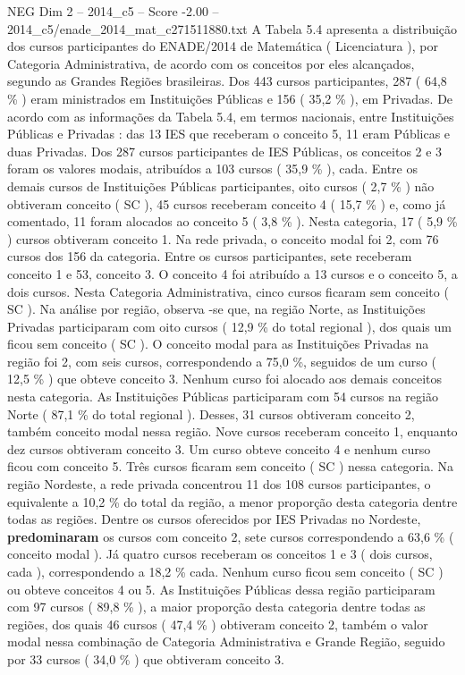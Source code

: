 \begin{textsample}{NEG Dim 2 – 2014\_c5 – Score -2.00 – 2014\_c5/enade\_2014\_mat\_c271511880.txt}
A Tabela 5.4 apresenta a distribuição dos cursos participantes do ENADE/2014 de Matemática ( Licenciatura ), por Categoria Administrativa, de acordo com os conceitos por eles alcançados, segundo as Grandes Regiões brasileiras.
Dos 443 cursos participantes, 287 ( 64,8 \% ) eram ministrados em Instituições Públicas e 156 ( 35,2 \% ), em Privadas.
De acordo com as informações da Tabela 5.4, em termos nacionais, entre Instituições Públicas e Privadas : das 13 IES que receberam o conceito 5, 11 eram Públicas e duas Privadas.
Dos 287 cursos participantes de IES Públicas, os conceitos 2 e 3 foram os valores modais, atribuídos a 103 cursos ( 35,9 \% ), cada.
Entre os demais cursos de Instituições Públicas participantes, oito cursos ( 2,7 \% ) não obtiveram conceito ( SC ), 45 cursos receberam conceito 4 ( 15,7 \% ) e, como já comentado, 11 foram alocados ao conceito 5 ( 3,8 \% ).
Nesta categoria, 17 ( 5,9 \% ) cursos obtiveram conceito 1.
Na rede privada, o conceito modal foi 2, com 76 cursos dos 156 da categoria.
Entre os cursos participantes, sete receberam conceito 1 e 53, conceito 3.
O conceito 4 foi atribuído a 13 cursos e o conceito 5, a dois cursos.
Nesta Categoria Administrativa, cinco cursos ficaram sem conceito ( SC ).
Na análise por região, observa -se que, na região Norte, as Instituições Privadas participaram com oito cursos ( 12,9 \% do total regional ), dos quais um ficou sem conceito ( SC ).
O conceito modal para as Instituições Privadas na região foi 2, com seis cursos, correspondendo a 75,0 \%, seguidos de um curso ( 12,5 \% ) que obteve conceito 3.
Nenhum curso foi alocado aos demais conceitos nesta categoria.
As Instituições Públicas participaram com 54 cursos na região Norte ( 87,1 \% do total regional ).
Desses, 31 cursos obtiveram conceito 2, também conceito modal nessa região.
Nove cursos receberam conceito 1, enquanto dez cursos obtiveram conceito 3.
Um curso obteve conceito 4 e nenhum curso ficou com conceito 5.
Três cursos ficaram sem conceito ( SC ) nessa categoria.
Na região Nordeste, a rede privada concentrou 11 dos 108 cursos participantes, o equivalente a 10,2 \% do total da região, a menor proporção desta categoria dentre todas as regiões.
Dentre os cursos oferecidos por IES Privadas no Nordeste, \textbf{predominaram} os cursos com conceito 2, sete cursos correspondendo a 63,6 \% ( conceito modal ).
Já quatro cursos receberam os conceitos 1 e 3 ( dois cursos, cada ), correspondendo a 18,2 \% cada.
Nenhum curso ficou sem conceito ( SC ) ou obteve conceitos 4 ou 5.
As Instituições Públicas dessa região participaram com 97 cursos ( 89,8 \% ), a maior proporção desta categoria dentre todas as regiões, dos quais 46 cursos ( 47,4 \% ) obtiveram conceito 2, também o valor modal nessa combinação de Categoria Administrativa e Grande Região, seguido por 33 cursos ( 34,0 \% ) que obtiveram conceito 3.

\end{textsample}
